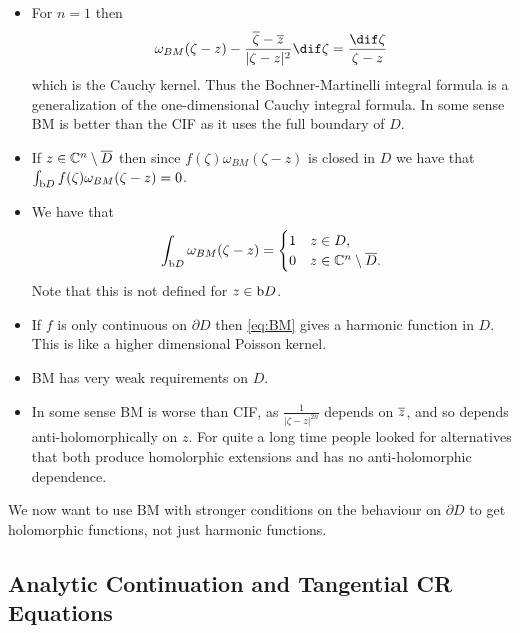 \begin{remark}
    \hphantom{.}
    \begin{itemize}
        \item For $n=1$ then
        \begin{align*}
            \omega_{BM}(\zeta - z) - \frac{\overline{\zeta} - \zz}{|\zeta - z|^2} \dif \zeta = \frac{\dif \zeta }{\zeta - z}
        \end{align*}
        which is the Cauchy kernel. Thus the Bochner-Martinelli integral formula is a generalization of the one-dimensional Cauchy integral formula. In some sense BM is better than the CIF as it uses the full boundary of $D$.
        \item If $z \in \mathbb{C}^n \setminus \overline{D}$ then since $f(\zeta) \omega_{BM}(\zeta - z)$ is closed in $D$ we have that $\int_{\operatorname{b}\! D} f(\zeta) \omega_{BM} (\zeta - z) = 0$.
        \item We have that
        \begin{align*}
            \int_{\operatorname{b}\! D} \omega_{BM} (\zeta - z) =
            \begin{cases}
                1 & z \in D,\\
                0 & z \in \mathbb{C}^n \setminus \overline{D}.
            \end{cases}
        \end{align*}
        Note that this is not defined for $z \in \operatorname{b}\! D$.
        \item If $f$ is only continuous on $\partial D$ then \eqref{eq:BM} gives a harmonic function in $D$. This is like a higher dimensional Poisson kernel.
        \item BM has very weak requirements on $D$.
        \item In some sense BM is worse than CIF, as $\frac{1}{|\zeta - z|^{2n}}$ depends on $\overline{z}$, and so depends anti-holomorphically on $z$. For quite a long time people looked for alternatives that both produce homolorphic extensions and has no anti-holomorphic dependence.
    \end{itemize}
\end{remark}

We now want to use BM with stronger conditions on the behaviour on $\partial D$ to get holomorphic functions, not just harmonic functions.

\subsection{Analytic Continuation and Tangential CR Equations}

